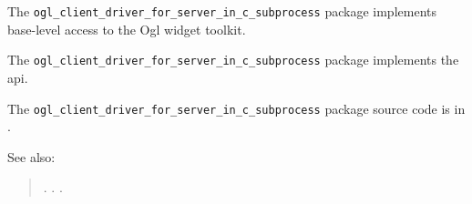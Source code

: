 
The {\tt ogl\_client\_driver\_for\_server\_in\_c\_subprocess} package implements base-level access to the Ogl widget 
toolkit.

The {\tt ogl\_client\_driver\_for\_server\_in\_c\_subprocess} package implements the  api.

The {\tt ogl\_client\_driver\_for\_server\_in\_c\_subprocess} package source code is in .

See also: 
\begin{quotation} 
.\newline 
{}.\newline 
{}.\newline 
\end{quotation} 


